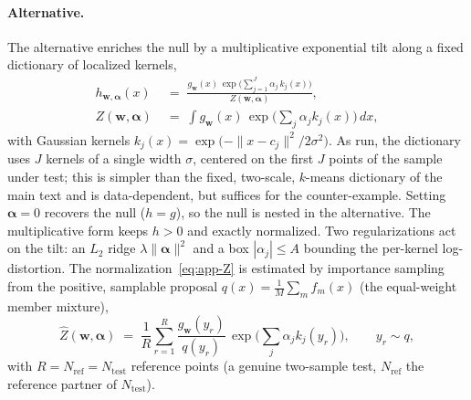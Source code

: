\paragraph{Alternative.}
The alternative enriches the null by a multiplicative exponential tilt along a
fixed dictionary of localized kernels,
\begin{align}
  h_{\boldsymbol w,\boldsymbol\alpha}(x)
  &\;=\; \frac{g_{\boldsymbol w}(x)\,
          \exp\!\big(\textstyle\sum_{j=1}^{J}\alpha_j\, k_j(x)\big)}
         {Z(\boldsymbol w,\boldsymbol\alpha)},
  \label{eq:app-alt}\\[2pt]
  Z(\boldsymbol w,\boldsymbol\alpha)
  &\;=\; \int g_{\boldsymbol w}(x)\,
         \exp\!\big(\textstyle\sum_j \alpha_j k_j(x)\big)\, dx ,
  \label{eq:app-Z}
\end{align}
with Gaussian kernels
$k_j(x)=\exp\!\big(-\|x-c_j\|^2/2\sigma^2\big)$. As run, the dictionary uses
$J$ kernels of a single width $\sigma$, centered on the first $J$ points of the
sample under test; this is simpler than the fixed, two-scale, $k$-means dictionary
of the main text and is data-dependent, but suffices for the counter-example.
Setting $\boldsymbol\alpha=0$ recovers the null ($h=g$), so the null is nested in
the alternative. The multiplicative form keeps $h>0$ and exactly normalized. Two
regularizations act on the tilt: an $L_2$ ridge $\lambda\|\boldsymbol\alpha\|^2$
and a box $|\alpha_j|\le A$ bounding the per-kernel log-distortion. The
normalization~\eqref{eq:app-Z} is estimated by importance sampling from the
positive, samplable proposal $q(x)=\tfrac1M\sum_m f_m(x)$ (the equal-weight member
mixture),
\begin{equation}\label{eq:app-Zhat}
  \widehat Z(\boldsymbol w,\boldsymbol\alpha)
  \;=\; \frac1R\sum_{r=1}^{R}\frac{g_{\boldsymbol w}(y_r)}{q(y_r)}\,
        \exp\!\big(\textstyle\sum_j \alpha_j k_j(y_r)\big),
  \qquad y_r\sim q ,
\end{equation}
with $R=N_{\mathrm{ref}}=N_{\mathrm{test}}$ reference points (a genuine two-sample
test, $N_{\mathrm{ref}}$ the reference partner of $N_{\mathrm{test}}$).

